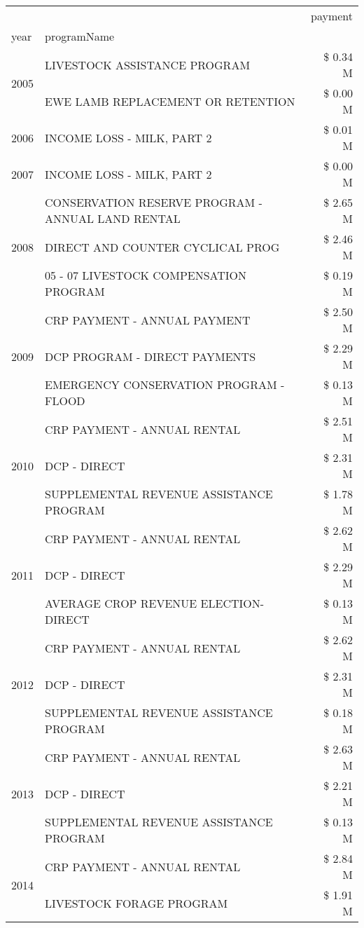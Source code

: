 \begin{tabular}{llr}
\toprule
 &  & payment \\
year & programName &  \\
\midrule
\multirow[t]{2}{*}{2005} & LIVESTOCK ASSISTANCE PROGRAM & \$ 0.34 M \\
 & EWE LAMB REPLACEMENT OR RETENTION & \$ 0.00 M \\
\cline{1-3}
2006 & INCOME LOSS - MILK, PART 2 & \$ 0.01 M \\
\cline{1-3}
2007 & INCOME LOSS - MILK, PART 2 & \$ 0.00 M \\
\cline{1-3}
\multirow[t]{3}{*}{2008} & CONSERVATION RESERVE PROGRAM - ANNUAL LAND RENTAL & \$ 2.65 M \\
 & DIRECT AND COUNTER CYCLICAL PROG & \$ 2.46 M \\
 & 05 - 07 LIVESTOCK COMPENSATION PROGRAM & \$ 0.19 M \\
\cline{1-3}
\multirow[t]{3}{*}{2009} & CRP PAYMENT - ANNUAL PAYMENT & \$ 2.50 M \\
 & DCP PROGRAM - DIRECT PAYMENTS & \$ 2.29 M \\
 & EMERGENCY CONSERVATION PROGRAM - FLOOD & \$ 0.13 M \\
\cline{1-3}
\multirow[t]{3}{*}{2010} & CRP PAYMENT - ANNUAL RENTAL & \$ 2.51 M \\
 & DCP - DIRECT & \$ 2.31 M \\
 & SUPPLEMENTAL REVENUE ASSISTANCE PROGRAM & \$ 1.78 M \\
\cline{1-3}
\multirow[t]{3}{*}{2011} & CRP PAYMENT - ANNUAL RENTAL & \$ 2.62 M \\
 & DCP - DIRECT & \$ 2.29 M \\
 & AVERAGE CROP REVENUE ELECTION-DIRECT & \$ 0.13 M \\
\cline{1-3}
\multirow[t]{3}{*}{2012} & CRP PAYMENT - ANNUAL RENTAL & \$ 2.62 M \\
 & DCP - DIRECT & \$ 2.31 M \\
 & SUPPLEMENTAL REVENUE ASSISTANCE PROGRAM & \$ 0.18 M \\
\cline{1-3}
\multirow[t]{3}{*}{2013} & CRP PAYMENT - ANNUAL RENTAL & \$ 2.63 M \\
 & DCP - DIRECT & \$ 2.21 M \\
 & SUPPLEMENTAL REVENUE ASSISTANCE PROGRAM & \$ 0.13 M \\
\cline{1-3}
\multirow[t]{3}{*}{2014} & CRP PAYMENT - ANNUAL RENTAL & \$ 2.84 M \\
 & LIVESTOCK FORAGE PROGRAM & \$ 1.91 M \\

\end{tabular}
